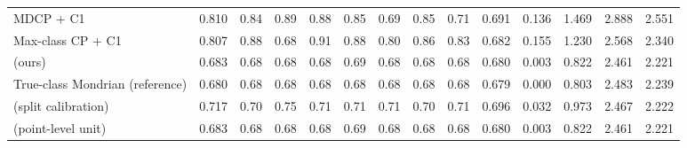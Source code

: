 \begin{table}[!htbp]
{\begin{tabular}{lccccccccccccc}
MDCP + C1 & 0.810 & 0.84 & 0.89 & 0.88 & 0.85 & 0.69 & 0.85 & 0.71 & 0.691 & 0.136 & 1.469 & 2.888 & 2.551 \\
Max-class CP + C1 & 0.807 & 0.88 & 0.68 & 0.91 & 0.88 & 0.80 & 0.86 & 0.83 & 0.682 & 0.155 & 1.230 & 2.568 & 2.340 \\
\gamut{} (ours) & 0.683 & 0.68 & 0.68 & 0.68 & 0.69 & 0.68 & 0.68 & 0.68 & 0.680 & 0.003 & 0.822 & 2.461 & 2.221 \\
True-class Mondrian (reference) & 0.680 & 0.68 & 0.68 & 0.68 & 0.68 & 0.68 & 0.68 & 0.68 & 0.679 & 0.000 & 0.803 & 2.483 & 2.239 \\
\gamut{} (split calibration) & 0.717 & 0.70 & 0.75 & 0.71 & 0.71 & 0.71 & 0.70 & 0.71 & 0.696 & 0.032 & 0.973 & 2.467 & 2.222 \\
\gamut{} (point-level unit) & 0.683 & 0.68 & 0.68 & 0.68 & 0.69 & 0.68 & 0.68 & 0.68 & 0.680 & 0.003 & 0.822 & 2.461 & 2.221 \\
\bottomrule
\end{tabular}}
\end{table}
\FloatBarrier

